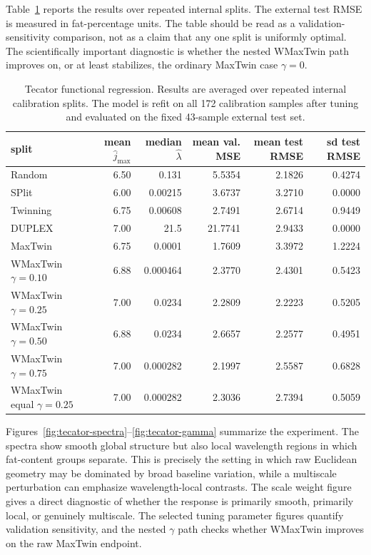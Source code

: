 Table~\ref{tab:tecator-wmaxtwin} reports the results over repeated internal
splits.  The external test RMSE is measured in fat-percentage units.  The table
should be read as a validation-sensitivity comparison, not as a claim that any
one split is uniformly optimal.  The scientifically important diagnostic is
whether the nested WMaxTwin path improves on, or at least stabilizes, the
ordinary MaxTwin case $\gamma=0$.

\begin{table}[t]
\centering
\caption{Tecator functional regression.  Results are averaged over repeated
internal calibration splits.  The model is refit on all 172 calibration samples
after tuning and evaluated on the fixed 43-sample external test set.}
\label{tab:tecator-wmaxtwin}
\begin{tabular}{lrrrrr}
\hline
split & mean $\widehat{j}_{\max}$ & median $\widehat\lambda$ & mean val. MSE & mean test RMSE & sd test RMSE \\
\hline
Random & 6.50 & 0.131 & 5.5354 & 2.1826 & 0.4274 \\
SPlit & 6.00 & 0.00215 & 3.6737 & 3.2710 & 0.0000 \\
Twinning & 6.75 & 0.00608 & 2.7491 & 2.6714 & 0.9449 \\
DUPLEX & 7.00 & 21.5 & 21.7741 & 2.9433 & 0.0000 \\
MaxTwin & 6.75 & 0.0001 & 1.7609 & 3.3972 & 1.2224 \\
WMaxTwin $\gamma=0.10$ & 6.88 & 0.000464 & 2.3770 & 2.4301 & 0.5423 \\
WMaxTwin $\gamma=0.25$ & 7.00 & 0.0234 & 2.2809 & 2.2223 & 0.5205 \\
WMaxTwin $\gamma=0.50$ & 6.88 & 0.0234 & 2.6657 & 2.2577 & 0.4951 \\
WMaxTwin $\gamma=0.75$ & 7.00 & 0.000282 & 2.1997 & 2.5587 & 0.6828 \\
WMaxTwin equal $\gamma=0.25$ & 7.00 & 0.000282 & 2.3036 & 2.7394 & 0.5059 \\
\hline
\end{tabular}
\end{table}

Figures~\ref{fig:tecator-spectra}--\ref{fig:tecator-gamma} summarize the
experiment.  The spectra show smooth global structure but also local wavelength
regions in which fat-content groups separate.  This is precisely the setting in
which raw Euclidean geometry may be dominated by broad baseline variation, while
a multiscale perturbation can emphasize wavelength-local contrasts.  The scale
weight figure gives a direct diagnostic of whether the response is primarily
smooth, primarily local, or genuinely multiscale.  The selected tuning parameter
figures quantify validation sensitivity, and the nested $\gamma$ path checks
whether WMaxTwin improves on the raw MaxTwin endpoint.

